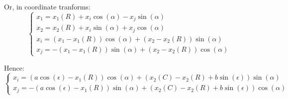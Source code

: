 \documentclass[a4paper,11pt,twoside,titlepage,openright]{book}
\numberwithin{equation}{section}
\newcommand{\ud}[1]{\underline{#1}}
\newcommand{\lt}{\left}
\newcommand{\rt}{\right}
\DeclareMathOperator{\ei}{\underline{e}_1}
\DeclareMathOperator{\et}{\underline{e}_2}
\begin{document}
Or, in coordinate tranforms:
$$
\lt\{
	\begin{array}{lll}
		x_1 = x_1(R) + x_i\cos(\alpha) - x_j\sin(\alpha)\\
		x_2 = x_2(R) + x_i\sin(\alpha) + x_j\cos(\alpha)\\
		x_i = (x_1-x_1(R))\cos(\alpha) + (x_2-x_2(R))\sin(\alpha)\\
		x_j = -(x_1-x_1(R))\sin(\alpha) + (x_2-x_2(R))\cos(\alpha)
	\end{array}
\rt.
$$

Hence:
$$
\lt\{
	\begin{array}{lll}
		x_i = \lt(a\cos(\epsilon)-x_1(R)\rt)\cos(\alpha) + \lt(x_2(C)-x_2(R) + b\sin(\epsilon)\rt)\sin(\alpha)\\
		x_j = -\lt(a\cos(\epsilon)-x_1(R)\rt)\sin(\alpha) + \lt(x_2(C)-x_2(R) + b\sin(\epsilon)\rt)\cos(\alpha)
	\end{array}
\rt.
$$













\end{document}
